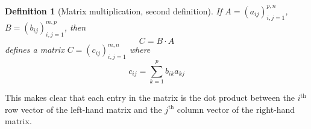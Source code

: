 \documentclass{book}
\newtheorem{definition}{Definition}[section]
\begin{document}
\begin{definition}[Matrix multiplication, second definition]
    If $A = \left(a_{ij}\right)^{p,n}_{i,j=1}$, $B = \left(b_{ij}\right)^{m,p}_{i,j=1}$, then
    \begin{equation*}
        C = B\cdot A
    \end{equation*}
    defines a matrix $C = \left(c_{ij}\right)^{m,n}_{i,j=1}$ where
    \begin{equation*}
        c_{ij} = \sum_{k=1}^{p} {b_{ik} a_{kj}}
    \end{equation*}
\end{definition}

This makes clear that each entry in the matrix is the dot product between the
$i^{\text{th}}$ row vector of the left-hand matrix and the $j^{\text{th}}$
column vector of the right-hand matrix. 
\pagebreak
\end{document}

